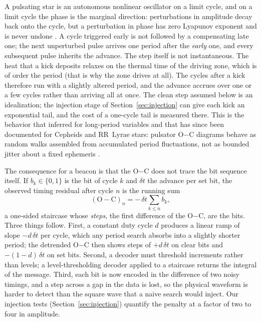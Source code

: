 \documentclass[final,5p]{elsarticle}
\newcommand{\oc}{O$-$C}
\begin{document}
A pulsating star is an autonomous nonlinear oscillator on a limit cycle, and on a limit cycle the phase is the marginal direction: perturbations in amplitude decay back onto the cycle, but a perturbation in phase has zero Lyapunov exponent and is never undone \citep{Buchler1997}. A cycle triggered early is not followed by a compensating late one; the next unperturbed pulse arrives one period after the \emph{early} one, and every subsequent pulse inherits the advance. The step itself is not instantaneous. The heat that a kick deposits relaxes on the thermal time of the driving zone, which is of order the period (that is why the zone drives at all). The cycles after a kick therefore run with a slightly altered period, and the advance accrues over one or a few cycles rather than arriving all at once. The clean step assumed below is an idealization; the injection stage of Section~\ref{sec:injection} can give each kick an exponential tail, and the cost of a one-cycle tail is measured there. This is the behavior that \citet{Eddington1929} inferred for long-period variables and that has since been documented for Cepheids and RR~Lyrae stars: pulsator \oc{} diagrams behave as random walks assembled from accumulated period fluctuations, not as bounded jitter about a fixed ephemeris \citep{Turner2006, Csornyei2022}.

The consequence for a beacon is that the \oc{} does not trace the bit sequence itself. If $b_k\in\{0,1\}$ is the bit of cycle $k$ and $\delta t$ the advance per set bit, the observed timing residual after cycle $n$ is the running sum
\begin{equation}
  (\mathrm{O}-\mathrm{C})_n = -\,\delta t \sum_{k\le n} b_k ,
  \label{eq:staircase}
\end{equation}
a one-sided staircase whose \emph{steps}, the first difference of the \oc{}, are the bits. Three things follow. First, a constant duty cycle $d$ produces a linear ramp of slope $-d\,\delta t$ per cycle, which any period search absorbs into a slightly shorter period; the detrended \oc{} then shows steps of $+d\,\delta t$ on clear bits and $-(1-d)\,\delta t$ on set bits. Second, a decoder must threshold increments rather than levels; a level-thresholding decoder applied to a staircase returns the integral of the message. Third, each bit is now encoded in the difference of two noisy timings, and a step across a gap in the data is lost, so the physical waveform is harder to detect than the square wave that a naive search would inject. Our injection tests (Section~\ref{sec:injection}) quantify the penalty at a factor of two to four in amplitude.
\end{document}
